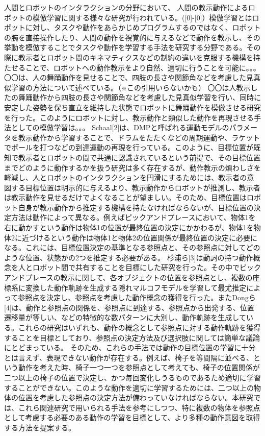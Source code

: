 人間とロボットのインタラクションの分野において、
人間の教示動作によるロボットの模倣学習に関する様々な研究が行われている。([0]-[0]）模倣学習とはロボットに対し、タスクや動作をあらかじめプログラムするのではなく、ロボットの腕を直接操作したり、人間の動作を視覚的に与えるなどで動作を教示し、その挙動を模倣することでタスクや動作を学習する手法を研究する分野である。その際に教示者とロボット間のキネマティクスなどの制約の違いを克服する機構を持たせることで、ロボットへの動作教示をより自然、適切に行うことを可能に。。。
〇〇は、人の舞踊動作を見せることで、四肢の長さや関節角などを考慮した見真似学習の方法について述べている。（※この引用いらないかも）
〇〇は人教示したの舞踊動作から四肢の長さや関節角などを考慮した見真似学習を行い、同時に安定した姿勢を保ち直立を維持した状態でロボットに舞踊動作を模倣させる研究を行った。このようにロボットに対し、教示動作と類似した動作を再現させる手法としての模倣学習は。。。
Schaal[2]は、DMPと呼ばれる運動モデルのパラメータを教示動作から学習することで、ドラムをたたくなどの周期運動や、ラケットでボールを打つなどの到達運動の再現を行っている。このように、目標位置が既知で教示者とロボットの間で共通に認識されているという前提で、その目標位置までどのように動作するかを扱う研究は多く存在するが、動作教示の煩わしさを軽減し、人とロボットのインタラクションを円滑にするためには、教示者の意図する目標位置は明示的に与えるより、教示動作からロボットが推測し、教示者は教示動作を見せるだけでよくなることが望ましい。そのため、目標位置はロボット自身が教示動作から推定する機構を持たなければならないが、目標位置の決定方法は動作によって異なる。例えばピックアンドプレースにおいて、物体1を右に動かすという動作は物体1の位置が最終位置の決定にかかわるが、物体1を物体2に近づけるという動作は物体1と物体2の位置関係が最終位置の決定に必要になる。これには、目標位置決定の基準となる参照点と、その参照点に対してどのような位置、状態かの2つを推定する必要がある。
杉浦ら[3]は動詞の持つ動作概念を人とロボット間で共有することを目標にした研究を行った。その中でピックアンドプレースの教示に関して、各オブジェクトの位置を参照点とし、複数の座標系に変換した動作軌跡を生成する隠れマルコフモデルを学習して最尤推定によって参照点を決定し、参照点を考慮した動作概念の獲得を行った。またDongら[4]は、動作と参照点の関係を、参照点に到達する、参照点から出発する、位置遷移量が等しい、などの特徴的な数パターンに大別し、動作軌跡を生成している。これらの研究はいずれも、動作の概念として参照点に対する動作軌跡を獲得することを目標としており、参照点の決定方法及び選択肢に関しては簡単な議論にとどまっている。
そのため、これらの手法では動作の目標位置の学習に十分とは言えず、表現できない動作が存在する。例えば、椅子を等間隔に並べる、という動作を考えた時、椅子一つ一つを参照点として考えても、椅子の位置関係が二つ以上の椅子の位置で決定し、かつ毎回変化しうるものであるため適切に学習することができない。このような動作を適切に学習するためには、二つ以上の物体の位置を考慮した参照点の決定方法が備わっていなければならない。本研究では、これら関連研究で用いられる手法を参考にしつつ、特に複数の物体を参照点として考慮する必要のある動作の学習を目標として、より多種の動作意図を取得する方法を提案する。        


